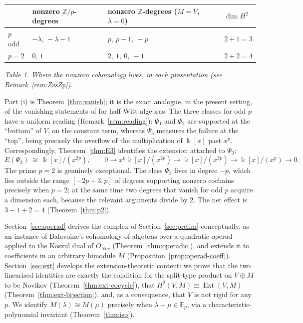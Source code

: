 \documentclass[11pt,reqno]{amsart}
\theoremstyle{plain}
\theoremstyle{definition}
\DeclareMathOperator{\Ext}{Ext}
\newcommand{\kk}{\Bbbk}
\newcommand{\Ht}{H^2}
\newcommand{\Fp}{\mathbb{F}_p}
\newcommand{\Zp}{\mathbb{Z}/p}
\begin{document}
\begin{center}
\begin{tabular}{@{}llll@{}}
\toprule
& nonzero $\Zp$-degrees & nonzero $\mathbb{Z}$-degrees ($M=V$, $\lambda=0$) & $\dim\Ht$\\
\midrule
$p$ odd & $-\lambda,\,-\lambda-1$ & $p,\ p-1,\ -p$ & $2+1=3$\\
$p=2$ & $0,\,1$ & $2,\ 1,\ 0,\ -1$ & $2+2=4$\\
\bottomrule
\end{tabular}
\end{center}
\emph{Table 1. Where the nonzero cohomology lives, in each presentation (see
Remark~\ref{rem:ZvsZp}).}

Part (i) is Theorem~\ref{thm:vanish}; it is the exact analogue, in the present setting, of
the vanishing statements of \cite{Dzhu1999} for half-Witt algebras. The three classes for
odd $p$ have a uniform reading (Remark~\ref{rem:reading}): $\Psi_1$ and $\Psi_2$ are
supported at the ``bottom'' of $V$, on the constant term, whereas $\Psi_3$ measures the
failure at the ``top'', being precisely the overflow of the multiplication of $\kk[x]$ past
$x^{p}$. Correspondingly, Theorem~\ref{thm:E3} identifies the extension attached to
$\Psi_3$:
\[
E(\Psi_3)\ \cong\ \kk[x]/(x^{2p}),\qquad
0\to x^p\kk[x]/(x^{2p})\to \kk[x]/(x^{2p})\to \kk[x]/(x^{p})\to 0 .
\]
The prime $p=2$ is genuinely exceptional. The class $\Psi_3$ lives in degree $-p$, which
lies outside the range $[-2p+3,p]$ of degrees supporting nonzero cochains precisely when
$p=2$; at the same time two degrees that vanish for odd $p$ acquire a dimension each, because
the relevant arguments divide by $2$. The net effect is $3-1+2=4$
(Theorem~\ref{thm:p2}).

Section~\ref{sec:operad} derives the complex of Section~\ref{sec:prelim} conceptually, as an
instance of Balavoine's cohomology of algebras over a quadratic operad
\cite{Balavoine1997,Balavoine1998} applied to the Koszul dual of $O_{Nov}$
(Theorem~\ref{thm:operadic}), and extends it to coefficients in an arbitrary bimodule $M$
(Proposition~\ref{prop:operad-coeff}). Section~\ref{sec:ext} develops the extension-theoretic
content: we prove that the two linearised identities are exactly the condition for the
split-type product on $V\oplus M$ to be Novikov (Theorem~\ref{thm:ext-cocycle}), that
$\Ht(V,M)\cong\Ext(V,M)$ (Theorem~\ref{thm:ext-bijection}), and, as a consequence, that $V$
is not rigid for any $p$. We identify $M(\lambda)\cong M(\mu)$ precisely when
$\lambda-\mu\in\Fp$, via a characteristic-polynomial invariant (Theorem~\ref{thm:iso}).
\end{document}
